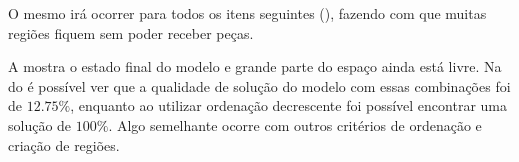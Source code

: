 

O mesmo irá ocorrer para todos os itens seguintes (), fazendo com que muitas
regiões fiquem sem poder receber peças.



A  mostra o estado final do modelo e grande parte do espaço ainda está livre.
Na  do  é possível ver que a qualidade de solução do modelo com
essas combinações foi de $12.75\%$, enquanto ao utilizar ordenação decrescente foi possível
encontrar uma solução de $100\%$.
Algo semelhante ocorre com outros critérios de ordenação e criação de regiões.


